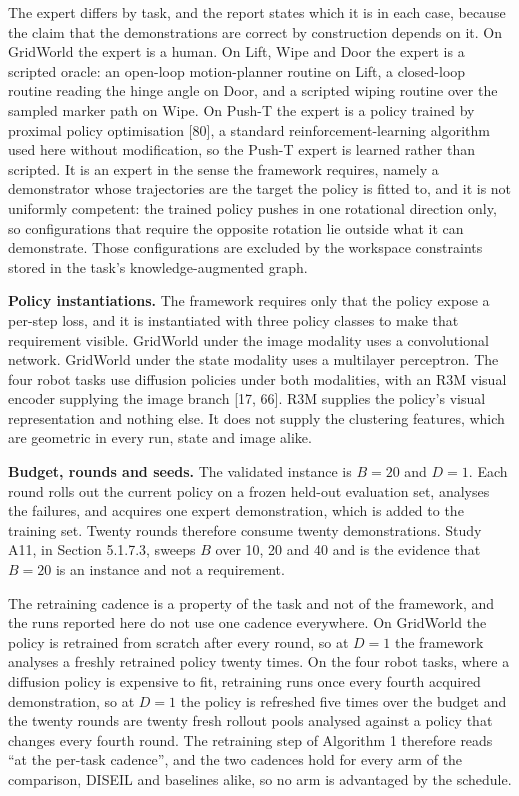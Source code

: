 \documentclass[
  11pt,
]{article}
\begin{document}
The expert differs by task, and the report states which it is in each
case, because the claim that the demonstrations are correct by
construction depends on it. On GridWorld the expert is a human. On Lift,
Wipe and Door the expert is a scripted oracle: an open-loop
motion-planner routine on Lift, a closed-loop routine reading the hinge
angle on Door, and a scripted wiping routine over the sampled marker
path on Wipe. On Push-T the expert is a policy trained by proximal
policy optimisation {[}80{]}, a standard reinforcement-learning
algorithm used here without modification, so the Push-T expert is
learned rather than scripted. It is an expert in the sense the framework
requires, namely a demonstrator whose trajectories are the target the
policy is fitted to, and it is not uniformly competent: the trained
policy pushes in one rotational direction only, so configurations that
require the opposite rotation lie outside what it can demonstrate. Those
configurations are excluded by the workspace constraints stored in the
task's knowledge-augmented graph.

\textbf{Policy instantiations.} The framework requires only that the
policy expose a per-step loss, and it is instantiated with three policy
classes to make that requirement visible. GridWorld under the image
modality uses a convolutional network. GridWorld under the state
modality uses a multilayer perceptron. The four robot tasks use
diffusion policies under both modalities, with an R3M visual encoder
supplying the image branch {[}17, 66{]}. R3M supplies the policy's
visual representation and nothing else. It does not supply the
clustering features, which are geometric in every run, state and image
alike.

\textbf{Budget, rounds and seeds.} The validated instance is \(B = 20\)
and \(D = 1\). Each round rolls out the current policy on a frozen
held-out evaluation set, analyses the failures, and acquires one expert
demonstration, which is added to the training set. Twenty rounds
therefore consume twenty demonstrations. Study A11, in Section 5.1.7.3,
sweeps \(B\) over 10, 20 and 40 and is the evidence that \(B = 20\) is
an instance and not a requirement.

The retraining cadence is a property of the task and not of the
framework, and the runs reported here do not use one cadence everywhere.
On GridWorld the policy is retrained from scratch after every round, so
at \(D = 1\) the framework analyses a freshly retrained policy twenty
times. On the four robot tasks, where a diffusion policy is expensive to
fit, retraining runs once every fourth acquired demonstration, so at
\(D = 1\) the policy is refreshed five times over the budget and the
twenty rounds are twenty fresh rollout pools analysed against a policy
that changes every fourth round. The retraining step of Algorithm 1
therefore reads ``at the per-task cadence'', and the two cadences hold
for every arm of the comparison, DISEIL and baselines alike, so no arm
is advantaged by the schedule.
\end{document}
